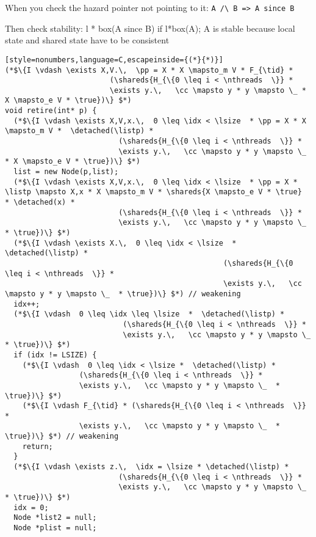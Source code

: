 \begin{figure*}
{\small

When you check the hazard pointer not pointing to it: \verb|A /\ B => A since B|

Then check stability: l * box(A since B) if l*box(A); 
A is stable because local state
and shared state have to be consistent

\begin{lstlisting}[style=nonumbers,language=C,escapeinside={(*}{*)}]
(*$\{I \vdash \exists X,V.\,  \pp = X * X \mapsto_m V * F_{\tid} * 
                        (\shareds{H_{\{0 \leq i < \nthreads  \}} * 
                        \exists y.\,   \cc \mapsto y * y \mapsto \_ * X \mapsto_e V * \true})\} $*)   
void retire(int* p) {  
  (*$\{I \vdash \exists X,V,x.\,  0 \leq \idx < \lsize  * \pp = X * X \mapsto_m V *  \detached(\listp) *
                          (\shareds{H_{\{0 \leq i < \nthreads  \}} * 
                          \exists y.\,   \cc \mapsto y * y \mapsto \_ * X \mapsto_e V * \true})\} $*)
  list = new Node(p,list);
  (*$\{I \vdash \exists X,V,x.\,  0 \leq \idx < \lsize  * \pp = X *  \listp \mapsto X,x * X \mapsto_m V * \shareds{X \mapsto_e V * \true}  * \detached(x) *
                          (\shareds{H_{\{0 \leq i < \nthreads  \}} * 
                          \exists y.\,   \cc \mapsto y * y \mapsto \_  * \true})\} $*)  
  (*$\{I \vdash \exists X.\,  0 \leq \idx < \lsize  * \detached(\listp) *
                                                  (\shareds{H_{\{0 \leq i < \nthreads  \}} * 
                                                  \exists y.\,   \cc \mapsto y * y \mapsto \_  * \true})\} $*) // weakening  
  idx++;
  (*$\{I \vdash  0 \leq \idx \leq \lsize  *  \detached(\listp) *
                           (\shareds{H_{\{0 \leq i < \nthreads  \}} * 
                           \exists y.\,   \cc \mapsto y * y \mapsto \_  * \true})\} $*)   
  if (idx != LSIZE) {
    (*$\{I \vdash  0 \leq \idx < \lsize *  \detached(\listp) *
                 (\shareds{H_{\{0 \leq i < \nthreads  \}} * 
                 \exists y.\,   \cc \mapsto y * y \mapsto \_  * \true})\} $*)  
    (*$\{I \vdash F_{\tid} * (\shareds{H_{\{0 \leq i < \nthreads  \}} * 
                 \exists y.\,   \cc \mapsto y * y \mapsto \_  * \true})\} $*) // weakening  
    return;
  }
  (*$\{I \vdash \exists z.\,  \idx = \lsize * \detached(\listp) *
                          (\shareds{H_{\{0 \leq i < \nthreads  \}} * 
                          \exists y.\,   \cc \mapsto y * y \mapsto \_  * \true})\} $*)   
  idx = 0;
  Node *list2 = null;
  Node *plist = null;

\end{lstlisting}}
\end{figure*}

